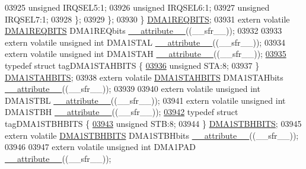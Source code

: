 \begin{DoxyCode}
03925       \textcolor{keywordtype}{unsigned} IRQSEL5:1;
03926       \textcolor{keywordtype}{unsigned} IRQSEL6:1;
03927       \textcolor{keywordtype}{unsigned} IRQSEL7:1;
03928     \};
03929   \};
03930 \} \hyperlink{a00014_de/d3d/a00409}{DMA1REQBITS};
03931 \textcolor{keyword}{extern} \textcolor{keyword}{volatile} \hyperlink{a00014_de/d3d/a00409}{DMA1REQBITS} DMA1REQbits \hyperlink{a00015_a493c46f03454991ccc5aa7a6e1dfb2a7}{\_\_attribute\_\_}((\_\_sfr\_\_));
03932 
03933 \textcolor{keyword}{extern} \textcolor{keyword}{volatile} \textcolor{keywordtype}{unsigned} \textcolor{keywordtype}{int}  DMA1STAL \hyperlink{a00015_a493c46f03454991ccc5aa7a6e1dfb2a7}{\_\_attribute\_\_}((\_\_sfr\_\_));
03934 \textcolor{keyword}{extern} \textcolor{keyword}{volatile} \textcolor{keywordtype}{unsigned} \textcolor{keywordtype}{int}  DMA1STAH \hyperlink{a00015_a493c46f03454991ccc5aa7a6e1dfb2a7}{\_\_attribute\_\_}((\_\_sfr\_\_));
\hypertarget{a00015_source_l03935}{}\hyperlink{a00014}{03935} \textcolor{keyword}{typedef} \textcolor{keyword}{struct }tagDMA1STAHBITS \{
\hypertarget{a00015_source_l03936}{}\hyperlink{a00014_a0eec78ddd2c12af678d5fab70fe62d14}{03936}   \textcolor{keywordtype}{unsigned} STA:8;
03937 \} \hyperlink{a00014_d9/d72/a00412}{DMA1STAHBITS};
03938 \textcolor{keyword}{extern} \textcolor{keyword}{volatile} \hyperlink{a00014_d9/d72/a00412}{DMA1STAHBITS} DMA1STAHbits \hyperlink{a00015_a493c46f03454991ccc5aa7a6e1dfb2a7}{\_\_attribute\_\_}((\_\_sfr\_\_));
03939 
03940 \textcolor{keyword}{extern} \textcolor{keyword}{volatile} \textcolor{keywordtype}{unsigned} \textcolor{keywordtype}{int}  DMA1STBL \hyperlink{a00015_a493c46f03454991ccc5aa7a6e1dfb2a7}{\_\_attribute\_\_}((\_\_sfr\_\_));
03941 \textcolor{keyword}{extern} \textcolor{keyword}{volatile} \textcolor{keywordtype}{unsigned} \textcolor{keywordtype}{int}  DMA1STBH \hyperlink{a00015_a493c46f03454991ccc5aa7a6e1dfb2a7}{\_\_attribute\_\_}((\_\_sfr\_\_));
\hypertarget{a00015_source_l03942}{}\hyperlink{a00014}{03942} \textcolor{keyword}{typedef} \textcolor{keyword}{struct }tagDMA1STBHBITS \{
\hypertarget{a00015_source_l03943}{}\hyperlink{a00014_a9bd043a4db27e09b5035a563a8758fe7}{03943}   \textcolor{keywordtype}{unsigned} STB:8;
03944 \} \hyperlink{a00014_da/d9c/a00413}{DMA1STBHBITS};
03945 \textcolor{keyword}{extern} \textcolor{keyword}{volatile} \hyperlink{a00014_da/d9c/a00413}{DMA1STBHBITS} DMA1STBHbits \hyperlink{a00015_a493c46f03454991ccc5aa7a6e1dfb2a7}{\_\_attribute\_\_}((\_\_sfr\_\_));
03946 
03947 \textcolor{keyword}{extern} \textcolor{keyword}{volatile} \textcolor{keywordtype}{unsigned} \textcolor{keywordtype}{int}  DMA1PAD \hyperlink{a00015_a493c46f03454991ccc5aa7a6e1dfb2a7}{\_\_attribute\_\_}((\_\_sfr\_\_));

\end{DoxyCode}
